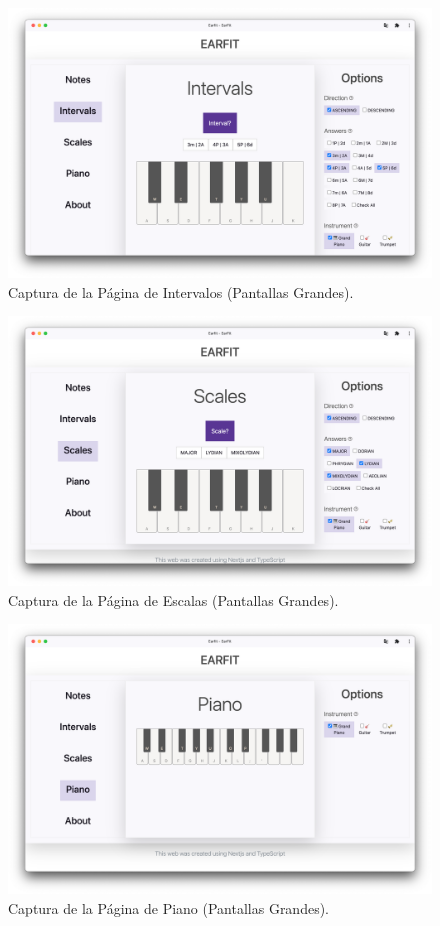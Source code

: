 \documentclass[12pt,twoside,titlepage]{report}
\begin{document}
\begin{figure}[H]
    \centering
    \includegraphics[scale=0.28]{Capturas Earfit/PC/Intervals}
    \caption{Captura de la Página de Intervalos (Pantallas Grandes).}
    \label{fig:PCIntervals}
\end{figure}

\begin{figure}[H]
    \centering
    \includegraphics[scale=0.28]{Capturas Earfit/PC/Scales}
    \caption{Captura de la Página de Escalas (Pantallas Grandes).}
    \label{fig:PCScales}
\end{figure}

\begin{figure}[H]
    \centering
    \includegraphics[scale=0.28]{Capturas Earfit/PC/Piano}
    \caption{Captura de la Página de Piano (Pantallas Grandes).}
    \label{fig:PCPiano}
\end{figure}
\end{document}
